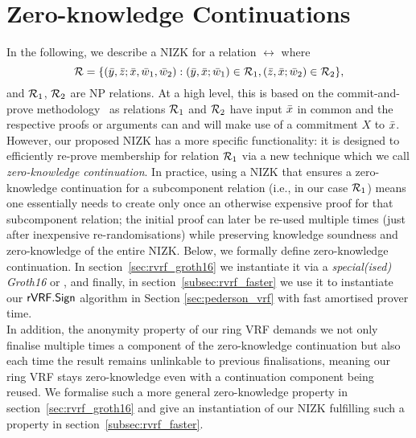 
\newcommand{\handan}[2]{{\sout{#1}}\textcolor{blue}{#2}}

\newcommand{\qhandan}[2]{{\uline{#1}}\textcolor{pink}{(#2)}}

\section{Zero-knowledge Continuations}
\label{sec:rvrf_cont}

\noindent In the following, we describe a NIZK for a relation $\rel$ where
$$\mathcal{R} = \{(\bar{y}, \bar{z}; \bar{x}, \bar{w}_1, \bar{w}_2):  (\bar{y}, \bar{x}; \bar{w}_1) \in \mathcal{R}_1, (\bar{z}, \bar{x}; \bar{w}_2) \in \mathcal{R}_2 \},$$
and $\mathcal{R}_1$, $\mathcal{R}_2$ are NP relations. 
At a high level, this is based on the commit-and-prove methodology~\cite{Kilian1990UsesOR,CLOS02,LegoSNARK} 
as relations $\mathcal{R}_1$ and $\mathcal{R}_2$ have input $\bar{x}$ in common and the respective 
proofs or arguments can and will make use of a commitment $X$ to $\bar{x}$. However, our proposed NIZK has a more specific functionality: 
it is designed to efficiently re-prove membership for relation $\mathcal{R}_1$ via a new technique which we call \emph{zero-knowledge continuation}. 
In practice, using a NIZK that ensures a zero-knowledge continuation for a 
subcomponent relation (i.e., in our case $\mathcal{R}_1$) means one essentially needs to create only once an otherwise expensive proof for that subcomponent 
relation; the initial proof can later be re-used multiple times (just after inexpensive re-randomisations) 
while preserving knowledge soundness and zero-knowledge of the entire NIZK. 
Below, we formally define zero-knowledge continuation. In section~\ref{sec:rvrf_groth16} we instantiate it via a \emph{special(ised) 
Groth16} or \SpecialG, and finally, in section~\ref{subsec:rvrf_faster} we use it to instantiate our $ {\mathsf{rVRF}}.{\mathsf{Sign}} $ algorithm in Section \ref{sec:pederson_vrf} with fast amortised prover time. \\

\noindent In addition, the anonymity property of our ring VRF demands we not only finalise multiple times a component of the zero-knowledge 
continuation but also each time the result remains unlinkable to previous finalisations, meaning our ring VRF stays zero-knowledge 
even with a continuation component being reused. We formalise such a more general zero-knowledge property in 
section~\ref{sec:rvrf_groth16} and give an instantiation of our NIZK fulfilling such a property in section~\ref{subsec:rvrf_faster}. 



